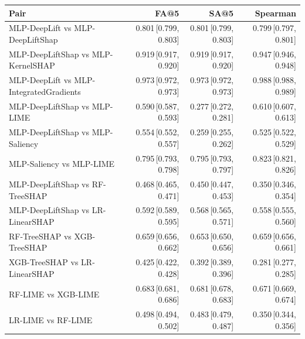 \small
\begin{tabular}{lrrr}
\toprule
Pair & FA@5 & SA@5 & Spearman \\
\midrule
MLP-DeepLift vs MLP-DeepLiftShap & 0.801\,{\scriptsize[0.799, 0.803]} & 0.801\,{\scriptsize[0.799, 0.803]} & 0.799\,{\scriptsize[0.797, 0.801]} \\
MLP-DeepLiftShap vs MLP-KernelSHAP & 0.919\,{\scriptsize[0.917, 0.920]} & 0.919\,{\scriptsize[0.917, 0.920]} & 0.947\,{\scriptsize[0.946, 0.948]} \\
MLP-DeepLift vs MLP-IntegratedGradients & 0.973\,{\scriptsize[0.972, 0.973]} & 0.973\,{\scriptsize[0.972, 0.973]} & 0.988\,{\scriptsize[0.988, 0.989]} \\
MLP-DeepLiftShap vs MLP-LIME & 0.590\,{\scriptsize[0.587, 0.593]} & 0.277\,{\scriptsize[0.272, 0.281]} & 0.610\,{\scriptsize[0.607, 0.613]} \\
MLP-DeepLiftShap vs MLP-Saliency & 0.554\,{\scriptsize[0.552, 0.557]} & 0.259\,{\scriptsize[0.255, 0.262]} & 0.525\,{\scriptsize[0.522, 0.529]} \\
MLP-Saliency vs MLP-LIME & 0.795\,{\scriptsize[0.793, 0.798]} & 0.795\,{\scriptsize[0.793, 0.797]} & 0.823\,{\scriptsize[0.821, 0.826]} \\
MLP-DeepLiftShap vs RF-TreeSHAP & 0.468\,{\scriptsize[0.465, 0.471]} & 0.450\,{\scriptsize[0.447, 0.453]} & 0.350\,{\scriptsize[0.346, 0.354]} \\
MLP-DeepLiftShap vs LR-LinearSHAP & 0.592\,{\scriptsize[0.589, 0.595]} & 0.568\,{\scriptsize[0.565, 0.571]} & 0.558\,{\scriptsize[0.555, 0.560]} \\
RF-TreeSHAP vs XGB-TreeSHAP & 0.659\,{\scriptsize[0.656, 0.662]} & 0.653\,{\scriptsize[0.650, 0.656]} & 0.659\,{\scriptsize[0.656, 0.661]} \\
XGB-TreeSHAP vs LR-LinearSHAP & 0.425\,{\scriptsize[0.422, 0.428]} & 0.392\,{\scriptsize[0.389, 0.396]} & 0.281\,{\scriptsize[0.277, 0.285]} \\
RF-LIME vs XGB-LIME & 0.683\,{\scriptsize[0.681, 0.686]} & 0.681\,{\scriptsize[0.678, 0.683]} & 0.671\,{\scriptsize[0.669, 0.674]} \\
LR-LIME vs RF-LIME & 0.498\,{\scriptsize[0.494, 0.502]} & 0.483\,{\scriptsize[0.479, 0.487]} & 0.350\,{\scriptsize[0.344, 0.356]} \\
\bottomrule
\end{tabular}
